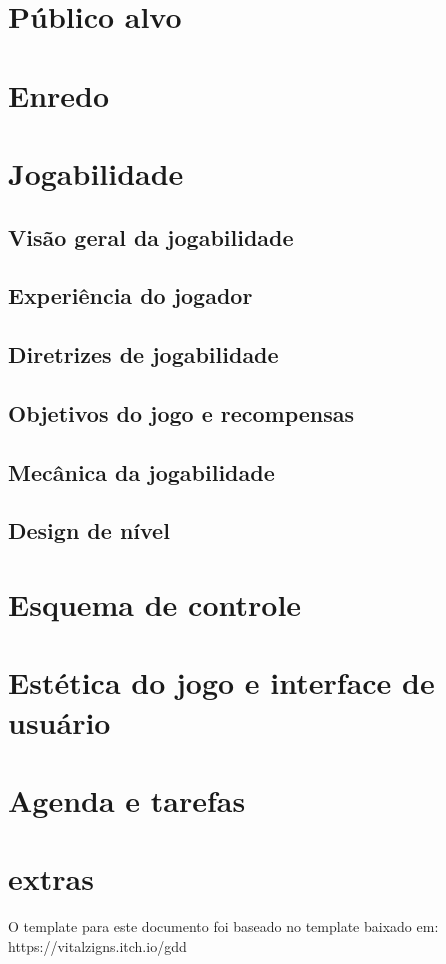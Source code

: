 \documentclass[12pt,a4paper]{article}
\begin{document}
\section{Público alvo}


\section{Enredo}

\section{Jogabilidade}

\subsection{Visão geral da jogabilidade}

\subsection{Experiência do jogador}

\subsection{Diretrizes de jogabilidade}

\subsection{Objetivos do jogo e recompensas}

\subsection{Mecânica da jogabilidade}

\subsection{Design de nível}

\section{Esquema de controle}

\section{Estética do jogo e interface de usuário}

\section{Agenda e tarefas}

\section{extras}

O template para este documento foi baseado no template baixado em: https://vitalzigns.itch.io/gdd
\end{document}
